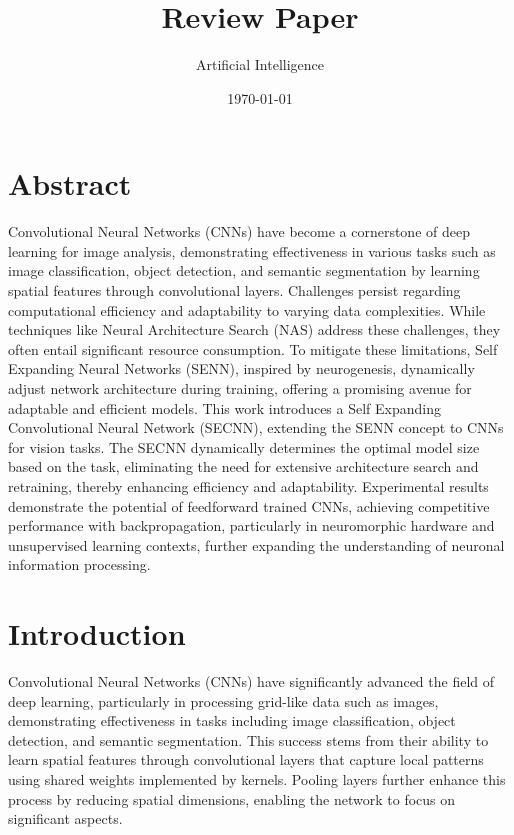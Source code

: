 \documentclass{article}
\begin{document}
\title{Review Paper}
\author{Artificial Intelligence}
\date{\today}
\maketitle
\noindent
\twocolumn

\section*{Abstract}
Convolutional Neural Networks (CNNs) have become a cornerstone of deep learning for image analysis, demonstrating effectiveness in various tasks such as image classification, object detection, and semantic segmentation by learning spatial features through convolutional layers. Challenges persist regarding computational efficiency and adaptability to varying data complexities. While techniques like Neural Architecture Search (NAS) address these challenges, they often entail significant resource consumption. To mitigate these limitations, Self Expanding Neural Networks (SENN), inspired by neurogenesis, dynamically adjust network architecture during training, offering a promising avenue for adaptable and efficient models. This work introduces a Self Expanding Convolutional Neural Network (SECNN), extending the SENN concept to CNNs for vision tasks. The SECNN dynamically determines the optimal model size based on the task, eliminating the need for extensive architecture search and retraining, thereby enhancing efficiency and adaptability. Experimental results demonstrate the potential of feedforward trained CNNs, achieving competitive performance with backpropagation, particularly in neuromorphic hardware and unsupervised learning contexts, further expanding the understanding of neuronal information processing.


\section*{Introduction}
Convolutional Neural Networks (CNNs) have significantly advanced the field of deep learning, particularly in processing grid-like data such as images, demonstrating effectiveness in tasks including image classification, object detection, and semantic segmentation. This success stems from their ability to learn spatial features through convolutional layers that capture local patterns using shared weights implemented by kernels. Pooling layers further enhance this process by reducing spatial dimensions, enabling the network to focus on significant aspects.
\end{document}
